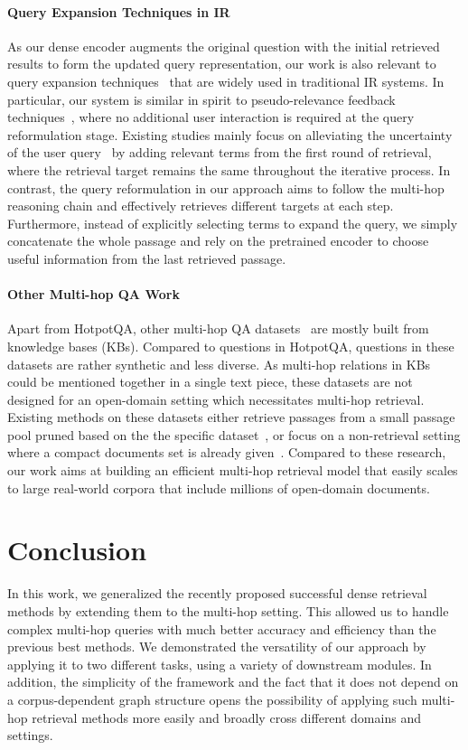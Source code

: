 \paragraph{Query Expansion Techniques in IR} As our dense encoder augments the original question with the initial retrieved results to form the updated query representation, our work is also relevant to query expansion techniques~\citep{rocchio1971relevance,voorhees1994query,ruthven2003survey} that are widely used in traditional IR systems. In particular, our system is similar in spirit to pseudo-relevance feedback techniques~\citep{croft1979using,cao2008selecting,lv2010positional}, where no additional user interaction is required at the query reformulation stage. Existing studies mainly focus on alleviating the uncertainty of the user query~\citep{collins2007estimation} by adding relevant terms from the first round of retrieval, where the retrieval target remains the same throughout the iterative process. In contrast, the query reformulation in our approach aims to follow the multi-hop reasoning chain and effectively retrieves different targets at each step. Furthermore, instead of explicitly selecting terms to expand the query, we simply concatenate the whole passage and rely on the pretrained encoder to choose useful information from the last retrieved passage.

\paragraph{Other Multi-hop QA Work} Apart from HotpotQA, other multi-hop QA datasets~\citep{Wikihop,ComplexWebQ,MetaQA} are mostly built from knowledge bases (KBs). Compared to questions in HotpotQA, questions in these datasets are rather synthetic and less diverse. As multi-hop relations in KBs could be mentioned together in a single text piece, these datasets are not designed for an open-domain setting which necessitates multi-hop retrieval. Existing methods on these datasets either retrieve passages from a small passage pool pruned based on the the specific dataset~\citep{sun2019pullnet,DrKIT}, or focus on a non-retrieval setting where a compact documents set is already given~\citep{de2018question,zhong2019coarse,tu2019multi,beltagy2020longformer}. Compared to these research, our work aims at building an efficient multi-hop retrieval model that easily scales to large real-world corpora that include millions of open-domain documents.

\section{Conclusion}
In this work, we generalized the recently proposed successful dense retrieval methods by extending them to the multi-hop setting.  This allowed us to handle complex multi-hop queries with much better accuracy and efficiency than the previous best methods.  We demonstrated the versatility of our approach by applying it to two different tasks, using a variety of downstream modules.  In addition, the simplicity of the framework and the fact that it does not depend on a corpus-dependent graph structure opens the possibility of applying such multi-hop retrieval methods more easily and broadly cross different domains and settings.

